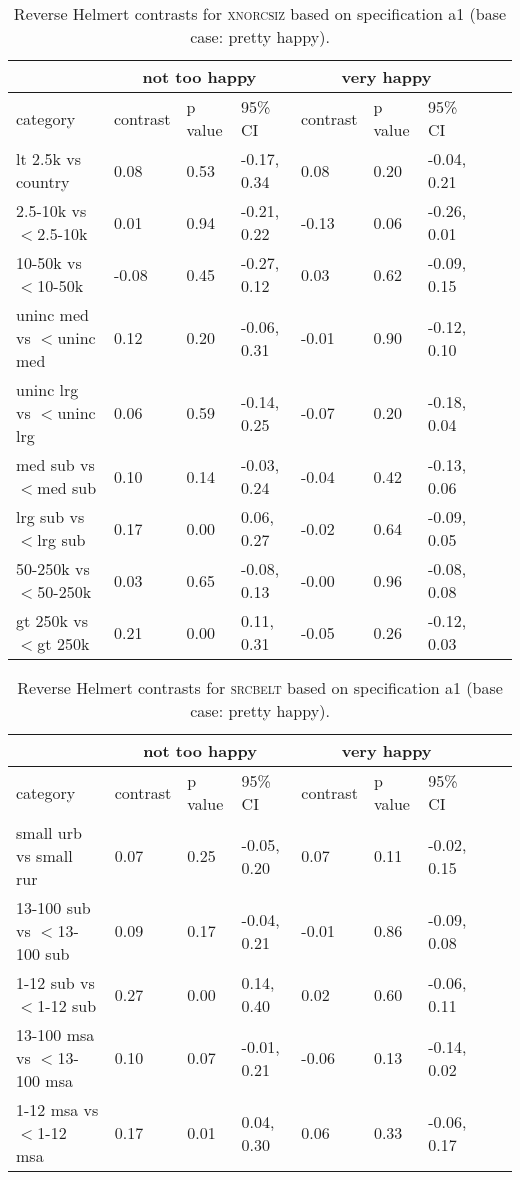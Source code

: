 \documentclass[12pt, letterpaper]{article}
\begin{document}
\begin{spacing}{1.9}
\begin{table}[H]\centering\footnotesize
\caption{\label{HE-xno}  Reverse Helmert contrasts for \textsc{xnorcsiz}
  based on specification a1 (base case: pretty happy).}
\begin{tabular}{llll|lllll}   \hline 
&\multicolumn{3}{c}{not too happy}&\multicolumn{3}{c}{very happy}\\\hline
 category&  contrast&   p value&     95\% CI& contrast&   p value&     95\% CI\\
    lt 2.5k vs  country& 0.08&0.53&-0.17, 0.34& 0.08&0.20& -0.04, 0.21\\             
    2.5-10k vs $<$2.5-10k& 0.01&0.94&-0.21, 0.22&-0.13&0.06& -0.26, 0.01\\             
      10-50k vs $<$10-50k&-0.08&0.45&-0.27, 0.12& 0.03&0.62& -0.09, 0.15\\             
uninc med vs $<$uninc med& 0.12&0.20&-0.06, 0.31&-0.01&0.90& -0.12, 0.10\\             
uninc lrg vs $<$uninc lrg& 0.06&0.59&-0.14, 0.25&-0.07&0.20& -0.18, 0.04\\             
    med sub vs $<$med sub& 0.10&0.14&-0.03, 0.24&-0.04&0.42& -0.13, 0.06\\             
    lrg sub vs $<$lrg sub& 0.17&0.00& 0.06, 0.27&-0.02&0.64& -0.09, 0.05\\             
    50-250k vs $<$50-250k& 0.03&0.65&-0.08, 0.13&-0.00&0.96& -0.08, 0.08\\             
  gt 250k vs $<$gt 250k& 0.21&0.00& 0.11, 0.31&-0.05&0.26& -0.12, 0.03\\\hline        
\end{tabular}\end{table}


\begin{table}[H]\centering\footnotesize
\caption{\label{HE-src}  Reverse Helmert contrasts for \textsc{srcbelt}
  based on specification a1 (base case: pretty happy).}
\begin{tabular}{llll|lllll}   \hline 
&\multicolumn{3}{c}{not too happy}&\multicolumn{3}{c}{very happy}\\\hline
 category&  contrast&   p value&     95\% CI& contrast&   p value&     95\% CI\\
    small urb vs  small   rur &0.07&0.25&-0.05, 0.20& 0.07&0.11&-0.02, 0.15\\
  13-100 sub vs $<$13-100 sub &0.09&0.17&-0.04, 0.21&-0.01&0.86&-0.09, 0.08\\
      1-12 sub vs $<$1-12 sub &0.27&0.00& 0.14, 0.40& 0.02&0.60&-0.06, 0.11\\
  13-100 msa vs $<$13-100 msa &0.10&0.07&-0.01, 0.21&-0.06&0.13&-0.14, 0.02\\
      1-12 msa vs $<$1-12 msa &0.17&0.01& 0.04, 0.30& 0.06&0.33&-0.06, 0.17\\ \hline
\end{tabular}\end{table}
  


\end{spacing}
\end{document}

